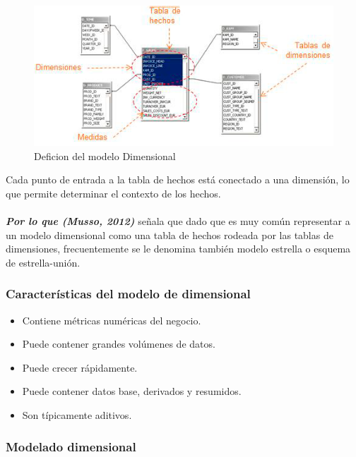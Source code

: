 \documentclass[11pt,a4paper]{article}
\begin{document}
			\begin{figure}[H]
				\begin{center}
					\includegraphics[scale=1.15]{./Imagenes/img05}	
					\caption{Deficion del modelo Dimensional}		
				\end{center}
			\end{figure}
		Cada punto de entrada a la tabla de hechos está conectado a una dimensión, lo que permite determinar el contexto de los hechos.\\
		\\
		\textit{\textbf{Por lo que (Musso, 2012)}} señala que dado que es muy común representar a un modelo dimensional como una tabla de hechos rodeada por las tablas de dimensiones, frecuentemente se le denomina también modelo estrella o esquema de estrella-unión. 
		
		\subsubsection{Características del modelo de dimensional}
		
		\begin{itemize}
			\item Contiene métricas numéricas del negocio.
			\item Puede contener grandes volúmenes de datos.
			\item Puede crecer rápidamente.
			\item Puede contener datos base, derivados y resumidos.
			\item Son típicamente aditivos.
		\end{itemize}
	
		\subsubsection{Modelado dimensional}
		
\end{document}
